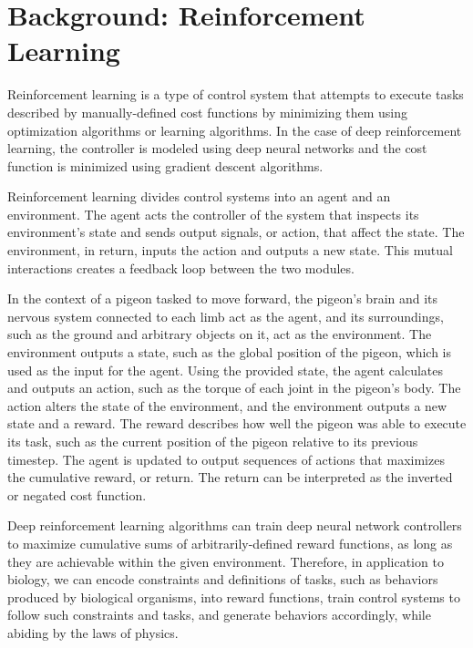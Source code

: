 \chapter{Background: Reinforcement Learning} \label{ch:background}
  Reinforcement learning is a type of control system that attempts to execute tasks described by manually-defined cost functions by minimizing them using optimization algorithms or learning algorithms. In the case of deep reinforcement learning, the controller is modeled using deep neural networks and the cost function is minimized using gradient descent algorithms.

  Reinforcement learning divides control systems into an agent and an environment. The agent acts the controller of the system that inspects its environment's state and sends output signals, or action, that affect the state. The environment, in return, inputs the action and outputs a new state. This mutual interactions creates a feedback loop between the two modules.

  In the context of a pigeon tasked to move forward, the pigeon's brain and its nervous system connected to each limb act as the agent, and its surroundings, such as the ground and arbitrary objects on it, act as the environment. The environment outputs a state, such as the global position of the pigeon, which is used as the input for the agent. Using the provided state, the agent calculates and outputs an action, such as the torque of each joint in the pigeon's body. The action alters the state of the environment, and the environment outputs a new state and a reward. The reward describes how well the pigeon was able to execute its task, such as the current position of the pigeon relative to its previous timestep. The agent is updated to output sequences of actions that maximizes the cumulative reward, or return. The return can be interpreted as the inverted or negated cost function.

  Deep reinforcement learning algorithms can train deep neural network controllers to maximize cumulative sums of arbitrarily-defined reward functions, as long as they are achievable within the given environment. Therefore, in application to biology, we can encode constraints and definitions of tasks, such as behaviors produced by biological organisms, into reward functions, train control systems to follow such constraints and tasks, and generate behaviors accordingly, while abiding by the laws of physics.

